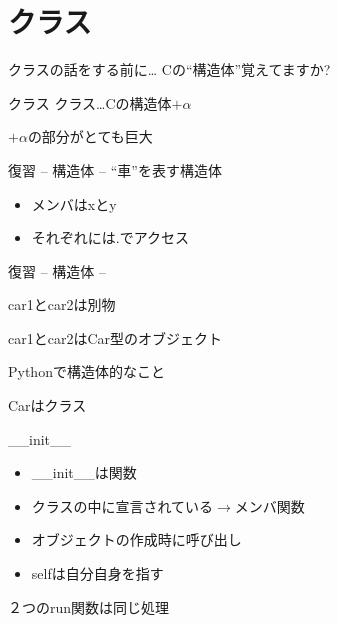\documentclass[12pt, xetex, xcolor=pdftex, dvipsnames]{beamer}
\begin{document}
\section{クラス}
\begin{frame}{クラスの話をする前に\dots}
    Cの{\Large ``構造体''}覚えてますか?
\end{frame}
\begin{frame}{クラス}
    クラス\dots Cの構造体{\Huge\alert{$+\alpha$}}

    \pause
    $+\alpha$の部分がとても巨大
\end{frame}
\begin{frame}[fragile]{復習 -- 構造体 --}
    ``車''を表す構造体

    

    \begin{itemize}
        \item メンバはxとy
        \item それぞれには.でアクセス
    \end{itemize}
\end{frame}
\begin{frame}[fragile]{復習 -- 構造体 --}
    

    car1とcar2は別物

    \pause
    car1とcar2はCar型のオブジェクト
\end{frame}
\begin{frame}[fragile]{Pythonで構造体的なこと}
    
    Carはクラス
\end{frame}
\begin{frame}{\_\_init\_\_}
    

    \begin{itemize}
        \item \_\_init\_\_は関数
        \item クラスの中に宣言されている$\rightarrow$メンバ関数
        \item オブジェクトの作成時に呼び出し
        \item selfは自分自身を指す
    \end{itemize}
\end{frame}
\begin{frame}[fragile]{２つのrun関数は同じ処理}
    
\end{frame}
\end{document}

